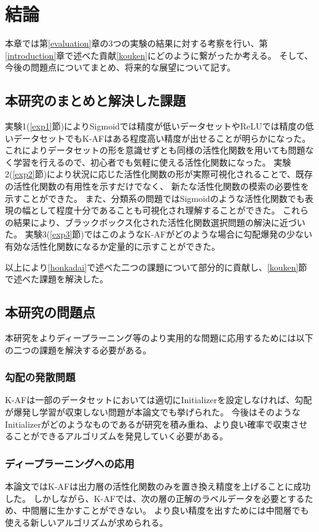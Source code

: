 \chapter{結論}
\label{conclusion}

本章では第\ref{evaluation}章の3つの実験の結果に対する考察を行い、第\ref{introduction}章で述べた貢献\ref{kouken}にどのように繋がったか考える。
そして、今後の問題点についてまとめ、将来的な展望について記す。


\section{本研究のまとめと解決した課題}
\label{matome}


 実験1(\ref{exp1}節)によりSigmoidでは精度が低いデータセットやReLUでは精度の低いデータセットでもK-AFはある程度高い精度が出せることが明らかになった。
これによりデータセットの形を意識せずとも同様の活性化関数を用いても問題なく学習を行えるので、初心者でも気軽に使える活性化関数になった。
 実験2(\ref{exp2}節)により状況に応じた活性化関数の形が実際可視化されることで、既存の活性化関数の有用性を示すだけでなく、
 新たな活性化関数の模索の必要性を示すことができた。
 また、分類系の問題ではSigmoidのような活性化関数でも表現の幅として程度十分であることも可視化され理解することができた。
これらの結果により、ブラックボックス化された活性化関数選択問題の解決に近づいた。
 実験3(\ref{exp3}節)ではこのようなK-AFがどのような場合に勾配爆発の少ない有効な活性化関数になるか定量的に示すことができた。

以上により\ref{honkadai}で述べた二つの課題について部分的に貢献し、\ref{kouken}節で述べた課題を解決した。



\section{本研究の問題点}
本研究をよりディープラーニング等のより実用的な問題に応用するためには以下の二つの課題を解決する必要がある。

\subsection{勾配の発散問題}
K-AFは一部のデータセットにおいては適切にInitializerを設定しなければ、勾配が爆発し学習が収束しない問題が本論文でも挙げられた。
今後はそのようなInitializerがどのようなものであるが研究を積み重ね、より良い確率で収束させることができるアルゴリズムを発見していく必要がある。

\subsection{ディープラーニングへの応用}
本論文ではK-AFは出力層の活性化関数のみを置き換え精度を上げることに成功した。
しかしながら、K-AFでは、次の層の正解のラベルデータを必要とするため、中間層に生かすことができない。
より良い精度を出すためには中間層でも使える新しいアルゴリズムが求められる。



